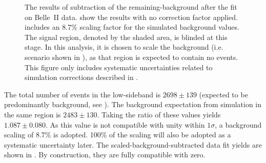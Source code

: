 \begin{figure}[htbp!]
    \centering
    \caption{\label{fig:sidebands_subtracted_figures} The results of subtraction of the remaining-\BB background after the fit on Belle~II data.
     show the results with no correction factor applied.
     includes an 8.7\% scaling factor for the simulated background values.
    The signal region, denoted by the shaded area, is blinded at this stage.
    In this analysis, it is chosen to scale the background (i.e. scenario shown in ),
    as that region is expected to contain no \BtoXsgamma events.
    This figure only includes systematic uncertainties related to simulation corrections described in .
    }
\end{figure}

The total number of events in the low-\EB sideband is $2698\pm139$ (expected to be predominantly background, see ).
The background expectation from simulation in the same region is $2483\pm130$.
Taking the ratio of these values yields $1.087\pm0.080$.
As this value is not compatible with unity within $1\sigma$, a background scaling of 8.7\% is adopted.
100\% of the scaling will also be adopted as a systematic uncertainty later.
The scaled-background-subtracted data fit yields are shown in .
By construction, they are fully compatible with zero.

